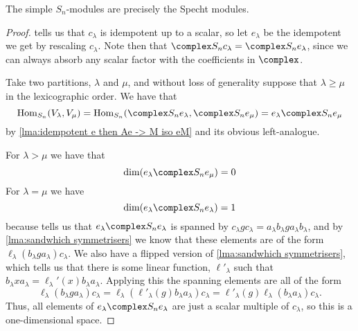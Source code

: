\begin{thm}{}{}
    The simple \(S_n\)-modules are precisely the Specht modules.
    \begin{proof}
         tells us that \(c_\lambda\) is idempotent up to a scalar, so let \(e_\lambda\) be the idempotent we get by rescaling \(c_\lambda\).
        Note then that \(\complex S_n c_\lambda = \complex S_n e_\lambda\), since we can always absorb any scalar factor with the coefficients in \(\complex\).
        
        Take two partitions, \(\lambda\) and \(\mu\), and without loss of generality suppose that \(\lambda \ge \mu\) in the lexicographic order.
        We have that
        \begin{equation}
            \Hom_{S_n}(V_\lambda, V_\mu) = \Hom_{S_n}(\complex S_n e_\lambda, \complex S_n e_\mu) = e_\lambda \complex S_n e_\mu
        \end{equation}
        by \cref{lma:idempotent e then Ae -> M iso eM} and its obvious left-analogue.
        
        For \(\lambda > \mu\) we have that
        \begin{equation}
            \dim(e_\lambda \complex S_n e_\mu) = 0
        \end{equation}
        For \(\lambda = \mu\) we have
        \begin{equation}
            \dim(e_\lambda \complex S_n e_\lambda) = 1
        \end{equation}
        because tells us that \(e_\lambda \complex S_n e_\lambda\) is spanned by \(c_\lambda g c_\lambda = a_\lambda b_\lambda g a_\lambda b_\lambda\), and by \cref{lma:sandwhich symmetrisers} we know that these elements are of the form \(\ell_\lambda(b_\lambda g a_\lambda) c_\lambda\).
        We also have a flipped version of \cref{lma:sandwhich symmetrisers}, which tells us that there is some linear function, \(\ell'_\lambda\) such that \(b_\lambda x a_\lambda = \ell_\lambda'(x)b_\lambda a_\lambda\).
        Applying this the spanning elements are all of the form
        \begin{equation}
            \ell_\lambda(b_\lambda g a_\lambda) c_\lambda = \ell_\lambda(\ell'_\lambda(g)b_\lambda a_\lambda) c_\lambda = \ell'_\lambda(g)\ell_\lambda(b_\lambda a_\lambda) c_\lambda.
        \end{equation}
        Thus, all elements of \(e_\lambda \complex S_n e_\lambda\) are just a scalar multiple of \(c_\lambda\), so this is a one-dimensional space.
        

\end{proof}
\end{thm}
